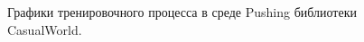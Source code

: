 \begin{figure}[t]
\begin{subfigure}{.47\textwidth}
    \end{subfigure}
    \caption{Графики тренировочного процесса в среде Pushing библиотеки CasualWorld.}
    \label{fig:cw_res}
\end{figure}

